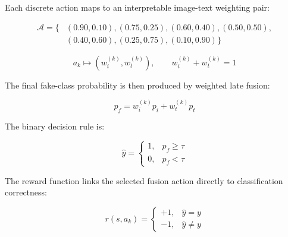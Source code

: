 Each discrete action maps to an interpretable image-text weighting pair:

\begin{equation}
\begin{aligned}\mathcal{A}=\{&(0.90,0.10),(0.75,0.25),(0.60,0.40),(0.50,0.50),\\ &(0.40,0.60),(0.25,0.75),(0.10,0.90)\}\end{aligned}
\label{eq:action_space}
\end{equation}

\begin{equation}
a_k \mapsto (w_i^{(k)}, w_t^{(k)}), \qquad w_i^{(k)} + w_t^{(k)} = 1
\label{eq:action_weight_mapping}
\end{equation}

The final fake-class probability is then produced by weighted late fusion:

\begin{equation}
p_f = w_i^{(k)}p_i + w_t^{(k)}p_t
\label{eq:fused_probability}
\end{equation}

The binary decision rule is:

\begin{equation}
\hat{y}=\begin{cases}1, & p_f \ge \tau \\ 0, & p_f < \tau\end{cases}
\label{eq:prediction_rule}
\end{equation}

The reward function links the selected fusion action directly to classification correctness:

\begin{equation}
r(s,a_k)=\begin{cases}+1, & \hat{y}=y \\ -1, & \hat{y}\ne y\end{cases}
\label{eq:reward_function}
\end{equation}

\clearpage
